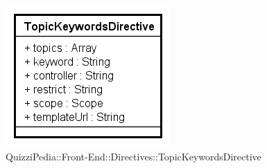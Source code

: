\begin{figure}[h]
	\centering
	\includegraphics[scale=0.80,keepaspectratio]{UML/Classi/Front-End/QuizziPedia_Front-end_Directives_TopicKeywordsDirective.png}
	\caption{QuizziPedia::Front-End::Directives::TopicKeywordsDirective}
\end{figure}

